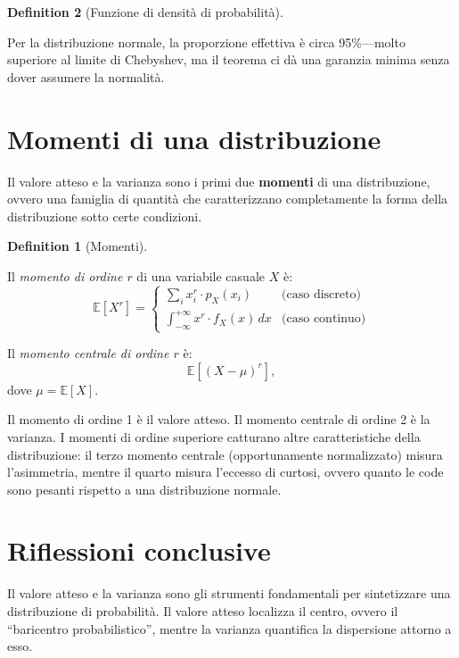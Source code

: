 \documentclass[
  letterpaper,
  DIV=11,
  numbers=noendperiod,
  oneside]{scrreprt}
\theoremstyle{definition}
\theoremstyle{plain}
\theoremstyle{definition}
\newtheorem{definition}{Definition}[chapter]
\theoremstyle{remark}
\begin{document}
\begin{definition}[Funzione di densità di
probabilità]
\begin{tcolorbox}
Per la distribuzione normale, la proporzione effettiva è circa
95\%---molto superiore al limite di Chebyshev, ma il teorema ci dà una
garanzia minima senza dover assumere la normalità.

\end{tcolorbox}

\section{Momenti di una
distribuzione}\label{momenti-di-una-distribuzione}

Il valore atteso e la varianza sono i primi due \textbf{momenti} di una
distribuzione, ovvero una famiglia di quantità che caratterizzano
completamente la forma della distribuzione sotto certe condizioni.

\begin{definition}[Momenti]\protect\hypertarget{def-moments}{}\label{def-moments}

Il \emph{momento di ordine \(r\)} di una variabile casuale \(X\) è: \[
\mathbb{E}[X^r] = \begin{cases}
\sum_i x_i^r \cdot p_X(x_i) & \text{(caso discreto)} \\
\int_{-\infty}^{+\infty} x^r \cdot f_X(x) \, dx & \text{(caso continuo)}
\end{cases}
\]

Il \emph{momento centrale di ordine \(r\)} è: \[
\mathbb{E}[(X - \mu)^r],
\] dove \(\mu = \mathbb{E}[X]\).

\end{definition}

Il momento di ordine 1 è il valore atteso. Il momento centrale di ordine
2 è la varianza. I momenti di ordine superiore catturano altre
caratteristiche della distribuzione: il terzo momento centrale
(opportunamente normalizzato) misura l'asimmetria, mentre il quarto
misura l'eccesso di curtosi, ovvero quanto le code sono pesanti rispetto
a una distribuzione normale.

\section*{Riflessioni conclusive}\label{riflessioni-conclusive-7}


Il valore atteso e la varianza sono gli strumenti fondamentali per
sintetizzare una distribuzione di probabilità. Il valore atteso
localizza il centro, ovvero il ``baricentro probabilistico'', mentre la
varianza quantifica la dispersione attorno a esso.


\end{definition}
\end{document}
